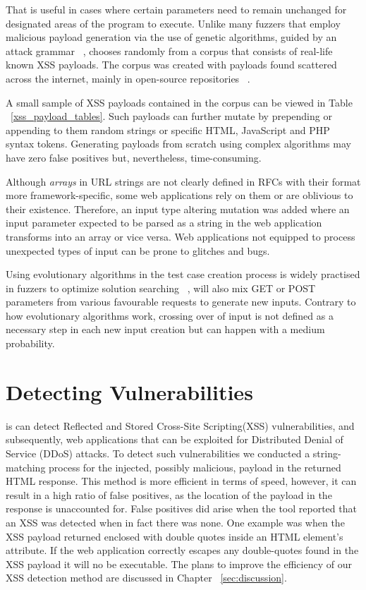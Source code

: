 That is useful in cases where certain parameters need to remain unchanged for designated areas of the program to execute. Unlike many fuzzers that employ malicious payload generation via the use of genetic algorithms, guided by an attack grammar ~\cite{duchene2014kameleonfuzz}, \pname{} chooses randomly from a corpus that consists of real-life known XSS payloads. The corpus was created with payloads found scattered across the internet, mainly in open-source repositories ~\cite{seclist,xsspayloadfirst,xsspayloadsecond}.

A small sample of XSS payloads contained in the corpus can be viewed in Table ~\ref{xss_payload_tables}. Such payloads can further mutate by prepending or appending to them random strings or specific HTML, JavaScript and PHP syntax tokens. Generating payloads from scratch using complex algorithms may have zero false positives but, nevertheless, time-consuming.

Although \emph{arrays} in URL strings are not clearly defined in RFCs with their format more framework-specific, some web applications rely on them or are oblivious to their existence. Therefore, an input type altering mutation was added where an input parameter expected to be parsed as a string in the web application transforms into an array or vice versa. Web applications not equipped to process unexpected types of input can be prone to glitches and bugs.

Using evolutionary algorithms in the test case creation process is widely practised in fuzzers
to optimize solution searching ~\cite{seal2016Genetic}, \pname{} will also mix GET or POST parameters from various favourable requests to generate new inputs. Contrary to how evolutionary algorithms work, crossing over of input is not defined as a necessary step in each new input creation but can happen with a medium probability.

\section{Detecting Vulnerabilities}
\pname{} is can detect Reflected and Stored Cross-Site Scripting(XSS) vulnerabilities, and subsequently, web applications that can be exploited for Distributed Denial of Service (DDoS) attacks. To detect such vulnerabilities we conducted a string-matching process for the injected, possibly malicious, payload in the returned HTML response. This method is more efficient in terms of speed, however, it can result in a high ratio of false positives, as the location of the payload in the response is unaccounted for. False positives did arise when the tool reported that an XSS was detected when in fact there was none. One example was when the XSS payload returned enclosed with double quotes inside an HTML element's attribute. If the web application correctly escapes any double-quotes found in the XSS payload it will no be executable. The plans to improve the efficiency of our XSS detection method are discussed in Chapter ~\ref{sec:discussion}.



